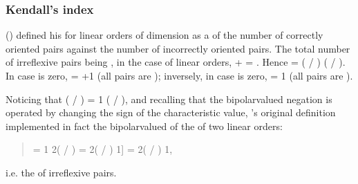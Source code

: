 \documentclass[a4paper,10pt,english]{sphinxhowto}
\begin{document}
\subsubsection{Kendall’s  index}
\label{\detokenize{tutorial:kendall-s-tau-index}}
 () defined his   for linear orders of dimension  as a  of the number  of correctly oriented pairs against the number  of incorrectly oriented pairs. The total number of irreflexive pairs being , in the case of linear orders,  +  = .  Hence  = ( / ) \sphinxhyphen{} ( / ). In case  is zero,  = +1 (all pairs are ); inversely, in case  is zero,  = \sphinxhyphen{}1 (all pairs are ).

Noticing that ( / ) = 1 \sphinxhyphen{} ( / ), and recalling that the bipolar\sphinxhyphen{}valued negation is operated by changing the sign of the characteristic value, ’s original  definition implemented in fact the bipolar\sphinxhyphen{}valued  of the  of two linear orders:
\begin{quote}

 = 1 \sphinxhyphen{} 2( / ) = \sphinxhyphen{}{[}2( / ) \sphinxhyphen{} 1{]} = 2( / ) \sphinxhyphen{} 1,
\end{quote}

i.e. the  of  irreflexive pairs.
\end{document}
